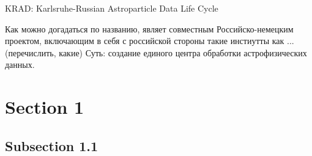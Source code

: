 \documentclass[18pt]{beamer}
\begin{document}
\begin{frame}{\textcolor{kit-green100}{KRAD}: \textcolor{kit-green100}{K}arlsruhe-\textcolor{kit-green100}{R}ussian \textcolor{kit-green100}{A}stroparticle \textcolor{kit-green100}{D}ata Life Cycle}

Как можно догадаться по названию, являет совместным Российско-немецким проектом, включающим в себя с российской стороны такие инстиутты как ... (перечислить, какие)
Суть: создание единого центра обработки астрофизических данных.

\end{frame}


\section{Section 1}
\subsection{Subsection 1.1}
%
%
\end{document}
